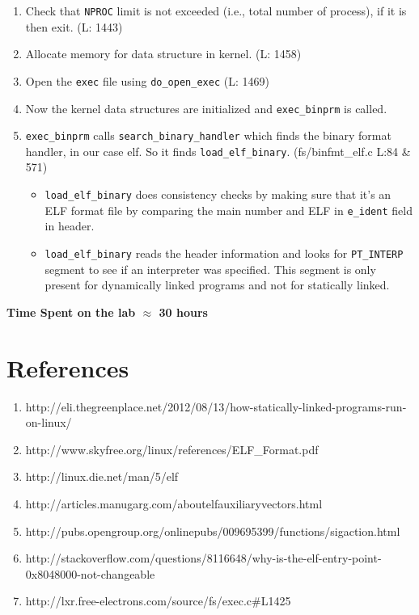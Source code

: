 \documentclass[10pt] {article}
\begin{document}
\begin{enumerate}
\item Check that \texttt{NPROC} limit is not exceeded (i.e., total number of process), if it is then exit. (L: 1443)
\item Allocate memory for data structure in kernel. (L: 1458) 
\item Open the \texttt{exec} file using \texttt{do\_open\_exec} (L: 1469)
\item Now the kernel data structures are initialized and \texttt{exec\_binprm} is called. 
\item \texttt{exec\_binprm} calls \texttt{search\_binary\_handler} which finds the binary format handler, in our case elf. So it finds \texttt{load\_elf\_binary}. (fs/binfmt\_elf.c L:84 \& 571)
\begin{itemize}
\item \texttt{load\_elf\_binary} does consistency checks by making sure that it's an ELF format file by comparing the main number and ELF in \texttt{e\_ident} field in header.
\item \texttt{load\_elf\_binary} reads the header information and looks for \texttt{PT\_INTERP} segment to see if an interpreter was specified. This segment is only present for dynamically linked programs and not for statically linked.
\end{itemize}
\end{enumerate}

\noindent \textbf{Time Spent on the lab \ensuremath{\approx} 30 hours} 

\section{References}
\begin{enumerate}
  \item http://eli.thegreenplace.net/2012/08/13/how-statically-linked-programs-run-on-linux/
  \item http://www.skyfree.org/linux/references/ELF\_Format.pdf
  \item http://linux.die.net/man/5/elf
  \item http://articles.manugarg.com/aboutelfauxiliaryvectors.html
  \item  http://pubs.opengroup.org/onlinepubs/009695399/functions/sigaction.html
  \item http://stackoverflow.com/questions/8116648/why-is-the-elf-entry-point-0x8048000-not-changeable
  \item http://lxr.free-electrons.com/source/fs/exec.c\#L1425
\end{enumerate}
\end{document}
